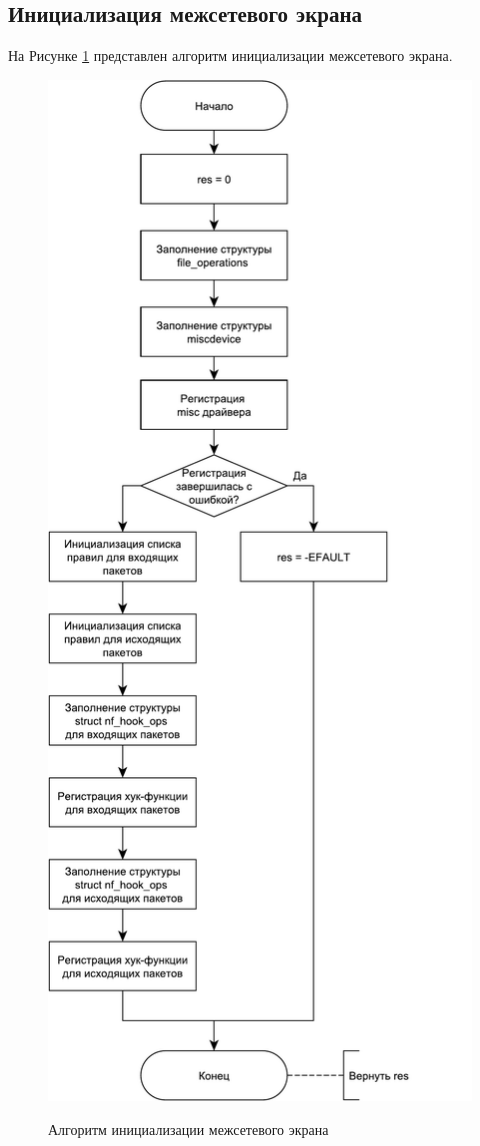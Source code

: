 \subsection{Инициализация межсетевого экрана}
На Рисунке \ref{fig21:image} представлен алгоритм инициализации межсетевого экрана.
\begin{figure}[h]
	\begin{center}
		{\includegraphics[scale = 0.46]{img/init.pdf}}
		\caption{Алгоритм инициализации межсетевого экрана}
		\label{fig21:image}
	\end{center}
\end{figure}

